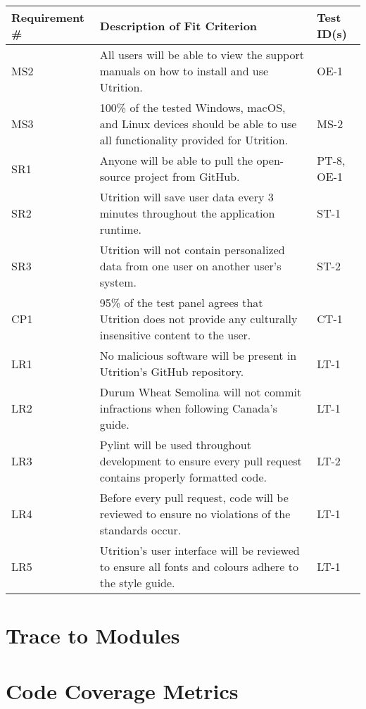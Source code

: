 \documentclass[12pt, titlepage]{article}
\begin{document}
	\begin{table}[H]
		\begin{tabularx}{\textwidth}{|l|X|l|}
			\hline
			{\bf Requirement \#} & {\bf Description of Fit Criterion} & {\bf Test ID(s)}\\
			\hline
			MS2 & All users will be able to view the support manuals on how to install and use Utrition. & OE-1\\
			\hline
			MS3 & 100\% of the tested Windows, macOS, and Linux devices should be able to use all functionality provided for Utrition. & MS-2\\
			\hline
			SR1 & Anyone will be able to pull the open-source project from GitHub. & PT-8, OE-1 \\
			\hline
			SR2 & Utrition will save user data every 3 minutes throughout the 
			application runtime. & ST-1\\
			\hline
			SR3 & Utrition will not contain personalized data from one user on another user's system. & ST-2\\
			\hline
			CP1 & 95\% of the test panel agrees that Utrition does not provide any culturally insensitive content to the user. & CT-1\\
			\hline
			LR1 & No malicious software will be present in Utrition’s GitHub repository. & LT-1\\
			\hline
			LR2 & Durum Wheat Semolina will not commit infractions when following Canada’s guide. & LT-1\\
			\hline
			LR3 & Pylint will be used throughout development to ensure every pull request contains properly formatted code. & LT-2\\
			\hline
			LR4 & Before every pull request, code will be reviewed to ensure no violations of the standards occur.  & LT-1\\
			\hline
			LR5 & Utrition's user interface will be reviewed to ensure all fonts and colours adhere to the style guide.  & LT-1\\
			\hline
		\end{tabularx}
	\end{table}
	
	\section{Trace to Modules}		
	
	\section{Code Coverage Metrics}
\end{document}
